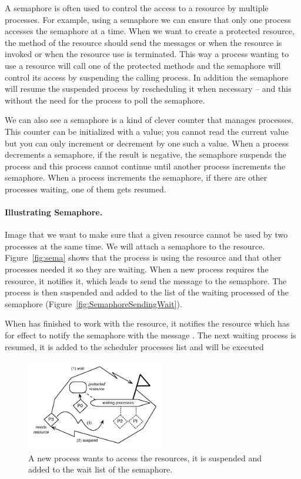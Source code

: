 \documentclass[a4paper,10pt,twoside]{book}
\begin{document}
A semaphore is often used to control the access  to a resource by multiple processes. For example, using a semaphore we can ensure that only one process accesses the semaphore at a time. 
When we want to create a protected resource, the method of the resource should send the messages  or  when the resource is invoked or  when the resource use is terminated. 
This way a process wanting to use a resource will call one of the protected methods and the semaphore
will control its access by suspending the calling process. In addition the semaphore will resume the suspended 
process by rescheduling it when necessary -- and this without the need for the process to poll the semaphore.


We can also see a semaphore is a kind of clever counter that manages processes. 
This counter can be initialized with a value;  you cannot read the current value but you can only increment or decrement by one such a value. When a process decrements a semaphore, if the result is negative, the 
semaphore suspends the process and this process cannot continue until another process increments 
the semaphore. When a process increments the semaphore, if there are other processes waiting, one of them gets resumed.



\paragraph{Illustrating Semaphore.}
Image that we want to make sure that a given resource cannot be used by two processes at the same time.
We will attach a semaphore to the resource. Figure~\ref{fig:sema} shows that the process  is using the resource and that other processes needed it so they are waiting. When a new process  requires the resource, it notifies it, which leads to send the message  to the semaphore. The process is then suspended and added to the list of the waiting processed of the semaphore (Figure~\ref{fig:SemaphoreSendingWait}). 


When  has finished to work with the resource, it notifies the resource which has for effect to notify the semaphore with the message . The next waiting process is resumed, it is added to the scheduler processes list and will be executed 


\begin{figure}
\begin{center}
\includegraphics[width=6cm]{SemaphoreSendingWait2}
\caption{A new process wants to access the resources, it is suspended and added to the wait list of the semaphore. }
\end{center}
\end{figure}
\end{document}
